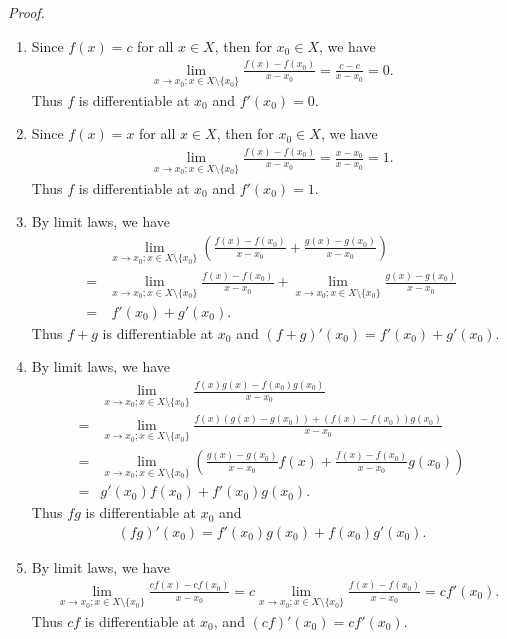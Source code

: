 \documentclass{book}
\newcommand{\pff}{\vspace{.25em}\noindent\emph{Proof.}~~}
\begin{document}
\pff
\begin{enumerate}
    \item Since $f(x)=c$ for all $x\in X$, then for $x_0\in X$, we have
        \begin{align*}
            \lim_{x\to x_0;x\in X\setminus\{x_0\}}\frac{f(x)-f(x_0)}{x-x_0}=\frac{c-c}{x-x_0}=0.
        \end{align*}
    Thus $f$ is differentiable at $x_0$ and $f'(x_0)=0$.

    \item Since $f(x)=x$ for all $x\in X$, then for $x_0\in X$, we have
        \begin{align*}
            \lim_{x\to x_0;x\in X\setminus\{x_0\}}\frac{f(x)-f(x_0)}{x-x_0}=\frac{x-x_0}{x-x_0}=1.
        \end{align*}
    Thus $f$ is differentiable at $x_0$ and $f'(x_0)=1$.

    \item By limit laws, we have
        \begin{align*}
            &\lim_{x\to x_0;x\in X\setminus\{x_0\}}\left(\frac{f(x)-f(x_0)}{x-x_0}+\frac{g(x)-g(x_0)}{x-x_0}\right)\\
            =&\lim_{x\to x_0;x\in X\setminus\{x_0\}}\frac{f(x)-f(x_0)}{x-x_0}+\lim_{x\to x_0;x\in X\setminus\{x_0\}}\frac{g(x)-g(x_0)}{x-x_0}\\
            =&\ f'(x_0)+g'(x_0).
        \end{align*}
    Thus $f+g$ is differentiable at $x_0$ and $(f+g)'(x_0)=f'(x_0)+g'(x_0)$.

    \item By limit laws, we have
        \begin{align*}
            &\lim_{x\to x_0;x\in X\setminus\{x_0\}}\frac{f(x)g(x)-f(x_0)g(x_0)}{x-x_0}\\
            =&\lim_{x\to x_0;x\in X\setminus\{x_0\}}\frac{f(x)(g(x)-g(x_0))+(f(x)-f(x_0))g(x_0)}{x-x_0}\\
            =&\lim_{x\to x_0;x\in X\setminus\{x_0\}}\left(\frac{g(x)-g(x_0)}{x-x_0}f(x)+\frac{f(x)-f(x_0)}{x-x_0}g(x_0)\right)\\
            =&g'(x_0)f(x_0)+f'(x_0)g(x_0).
        \end{align*}
    Thus $fg$ is differentiable at $x_0$ and 
        \begin{align*}
            (fg)'(x_0)=f'(x_0)g(x_0)+f(x_0)g'(x_0).
        \end{align*}

    \item By limit laws, we have
        \begin{align*}
            &\lim_{x\to x_0;x\in X\setminus\{x_0\}}\frac{cf(x)-cf(x_0)}{x-x_0}
            =c\lim_{x\to x_0;x\in X\setminus\{x_0\}}\frac{f(x)-f(x_0)}{x-x_0}=cf'(x_0).
        \end{align*}
    Thus $cf$ is differentiable at $x_0$, and $(cf)'(x_0)=cf'(x_0)$.


\end{enumerate}
\end{document}
